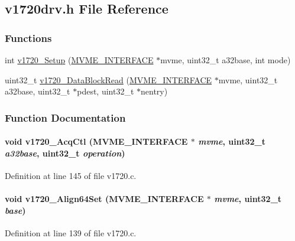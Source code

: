 \subsection{v1720drv.h File Reference}
\label{v1720drv_8h}
\subsubsection*{Functions}
\begin{DoxyCompactItemize}
\item 
int \hyperlink{v1720drv_8h_ad79d55b32ab0e0c0c849267d56eaf05a}{v1720\_\-Setup} (\hyperlink{structMVME__INTERFACE}{MVME\_\-INTERFACE} $\ast$mvme, uint32\_\-t a32base, int mode)
\item 
uint32\_\-t \hyperlink{v1720drv_8h_ad72f8cd0b6dc80af08ee5e9a7fe03f4c}{v1720\_\-DataBlockRead} (\hyperlink{structMVME__INTERFACE}{MVME\_\-INTERFACE} $\ast$mvme, uint32\_\-t a32base, uint32\_\-t $\ast$pdest, uint32\_\-t $\ast$nentry)
\end{DoxyCompactItemize}


\subsubsection{Function Documentation}
\paragraph[{v1720\_\-AcqCtl}]{\setlength{\rightskip}{0pt plus 5cm}void v1720\_\-AcqCtl ({\bf MVME\_\-INTERFACE} $\ast$ {\em mvme}, \/  uint32\_\-t {\em a32base}, \/  uint32\_\-t {\em operation})}\hfill\label{v1720drv_8h_abf7f29bdc0764bc0aab9ca880ada677f}


Definition at line 145 of file v1720.c.
\paragraph[{v1720\_\-Align64Set}]{\setlength{\rightskip}{0pt plus 5cm}void v1720\_\-Align64Set ({\bf MVME\_\-INTERFACE} $\ast$ {\em mvme}, \/  uint32\_\-t {\em base})}\hfill\label{v1720drv_8h_a962f78126c5bc0ef1d424d1c45c53c85}


Definition at line 139 of file v1720.c.
